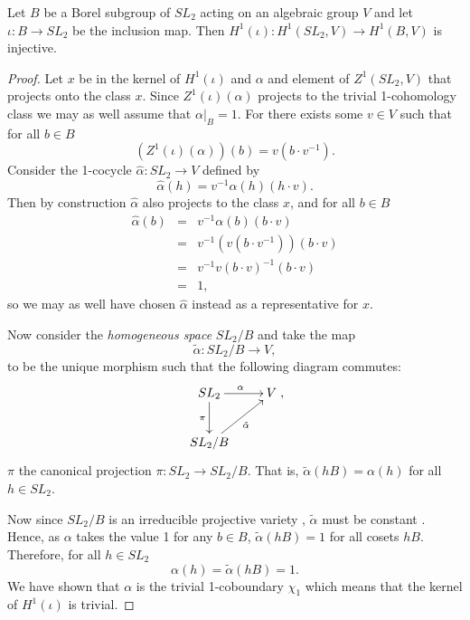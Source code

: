 \begin{lemma} Let $B$ be a Borel subgroup of $SL_2$ acting on an algebraic group $V$ and let $\iota : B \rightarrow SL_2$ be the inclusion map. Then $H^1(\iota):H^1(SL_2, V)\rightarrow H^1(B, V)$ is injective.
  \label{lem:sl2_b_inj}
\end{lemma}
\begin{proof}
Let $x$ be in the kernel of $H^1(\iota)$ and $\alpha$ and element of $Z^1(SL_2, V)$ that projects onto the class $x$. Since $Z^1(\iota)(\alpha)$ projects to the trivial 1-cohomology class we may as well assume that $\alpha|_B = 1$. For there exists some $v \in V$ such that for all $b \in B$
\begin{displaymath}
	\left(Z^1(\iota)(\alpha) \right)(b) = v (b \cdot v^{-1}).
\end{displaymath}
Consider the 1-cocycle $\hat{\alpha}:SL_2\rightarrow V$ defined by
\begin{displaymath}
	\hat{\alpha}(h) = v^{-1} \alpha(h) (h \cdot v).
\end{displaymath}
Then by construction $\hat{\alpha}$ also projects to the class $x$, and for all $b \in B$
\begin{eqnarray*}
	\hat{\alpha}(b) &=& v^{-1} \alpha(b) (b \cdot v) \\
	&=& v^{-1} (v (b\cdot v^{-1})) (b \cdot v)\\
	&=& v^{-1} v (b\cdot v)^{-1} (b \cdot v)\\
	&=& 1,
\end{eqnarray*}
so we may as well have chosen $\hat{\alpha}$ instead as a representative for $x$. 

Now consider the \emph{homogeneous space} $SL_2/B$ and take the map 
\begin{displaymath}
	\tilde{\alpha}:SL_2/B \rightarrow V,
\end{displaymath}
to be the unique morphism such that the following diagram commutes:
\begin{displaymath}
	\xymatrix{
	SL_2 \ar[r]^{\alpha} \ar[d]_{\pi} & V\\
	SL_2/B \ar[ru]_{\tilde{\alpha}}
	},
\end{displaymath}
$\pi$ the canonical projection $\pi:SL_2 \rightarrow SL_2/B$. That is, $\tilde{\alpha}(hB) = \alpha(h)$ for all $h \in SL_2$.

Now since $SL_2/B$ is an irreducible projective variety \cite[Theorem 21.3]{humphreys1975linear}, $\tilde{\alpha}$ must be constant  \cite{borel1991linear}. Hence, as $\alpha$ takes the value 1 for any $b \in B$, $\tilde{\alpha}(hB) = 1$ for all cosets $hB$. Therefore, for all $h \in SL_2$
\begin{displaymath}
	\alpha(h) = \tilde{\alpha}(hB) = 1.
\end{displaymath}
We have shown that $\alpha$ is the trivial 1-coboundary $\chi_1$ which means that the kernel of $H^1(\iota)$ is trivial.
\end{proof} 


